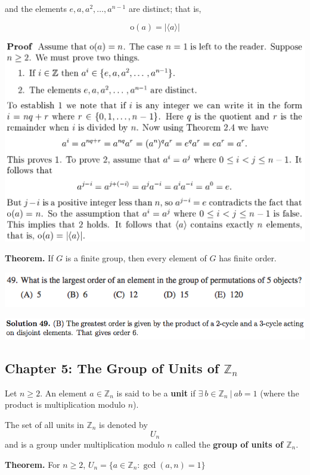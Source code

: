\documentclass{article}
\begin{document}
and the elements \(e, a, a^2, \ldots, a^{n-1}\) are distinct; that is, 

\[
\text{o}(a) = | \langle a \rangle |
\]

\includegraphics[scale=0.4]{ch4_proof}

\textbf{Theorem.} If \(G\) is a finite group, then every element of \(G\) has finite order.

\includegraphics[scale=0.65]{1268_49}

\includegraphics[scale=0.65]{1268_49s}

\pagebreak
\subsection{Chapter 5: The Group of Units of \(\mathbb{Z}_n\)}

Let \(n \geq 2\). An element \(a \in \mathbb{Z}_n\) is said to be a \textbf{unit} if \(\exists \ b \in \mathbb{Z}_n \ | \ ab = 1\) (where the product is multiplication modulo \(n\)). 

The set of all units in \(\mathbb{Z}_n\) is denoted by \[U_n\] and is a group under multiplication modulo \(n\) called the \textbf{group of units of \(\mathbb{Z}_n\)}.

\textbf{Theorem.} For \(n \geq 2 \), \(U_n = \{a \in \mathbb{Z}_n: \gcd(a, n) = 1 \} \)
\end{document}
